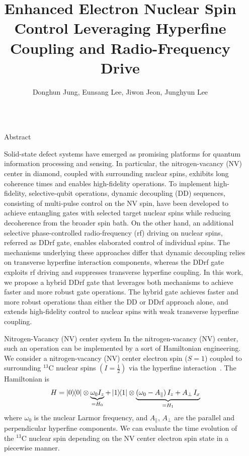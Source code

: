 \documentclass[final]{beamer}
\title{Enhanced Electron Nuclear Spin Control Leveraging Hyperfine Coupling and Radio-Frequency Drive}
\author{Donghun Jung\inst{1, }\inst{2}, Eunsang Lee\inst{1}, Jiwon Jeon\inst{1}, Junghyun Lee\inst{1, $\dagger$}}
\institute[shortinst]{\inst{1} Center for Quantum Information, Korea Institute of Science and Technology, Seoul 02792, Republic of Korea \linebreak \inst{2} Department of Physics, Sungkyunkwan University, Suwon 16419, Republic of Korea}
\newlength{\sepwidth}
\newlength{\colwidth}
\newcommand{\separatorcolumn}{\begin{column}{\sepwidth}\end{column}}
\begin{document}
\begin{frame}[t]
\begin{columns}[t]
\separatorcolumn

\begin{column}{\colwidth}
  \begin{alertblock}{Abstract}

  Solid-state defect systems have emerged as promising platforms for quantum information processing and sensing.
  In particular, the nitrogen-vacancy (NV) center in diamond, coupled with surrounding nuclear spins, exhibits long coherence times and enables high-fidelity operations.
  To implement high-fidelity, selective-qubit operations, dynamic decoupling (DD) sequences, consisting of multi-pulse control on the NV spin, have been developed to achieve entangling gates with selected target nuclear spins while reducing decoherence from the broader spin bath.
  On the other hand, an additional selective phase-controlled radio-frequency (rf) driving on nuclear spins, referred as DDrf gate, enables elaborated control of individual spins.
  The mechanisms underlying these approaches differ that dynamic decoupling relies on transverse hyperfine interaction components, whereas the DDrf gate exploits rf driving and suppresses transverse hyperfine coupling.
  In this work, we propose a hybrid DDrf gate that leverages both mechanisms to achieve faster and more robust gate operations.
  The hybrid gate achieves faster and more robust operations than either the DD or DDrf approach alone, and extends high-fidelity control to nuclear spins with weak transverse hyperfine coupling.

  \end{alertblock}


  \begin{block}{Nitrogen-Vacancy (NV) center system}
  In the nitrogen-vacancy (NV) center, such an operation can be implemented by a sort of Hamiltonian engineering.
  We consider a nitrogen-vacancy (NV) center electron spin ($S = 1$) coupled to surrounding $^{13}$C nuclear spins $(I=\frac{1}{2})$ via the hyperfine interaction~\cite{taminiau2012}.
  The Hamiltonian is
  $$
  H = \ketbra{0} \otimes \underbrace{\omega_0 I_z}_{= H_0}+ \ketbra{1} \otimes \underbrace{ (\omega_0 - A_\parallel)\, I_z + A_\perp\, I_x}_{= H_1}
  $$
  where $\omega_0$ is the nuclear Larmor frequency, and $A_\parallel$, $A_\perp$ are the parallel and perpendicular hyperfine components.
  We can evaluate the time evolution of the $^{13}$C nuclear spin depending on the NV center electron spin state in a piecewise manner.
  \end{block}



\end{column}
\end{columns}
\end{frame}
\end{document}
